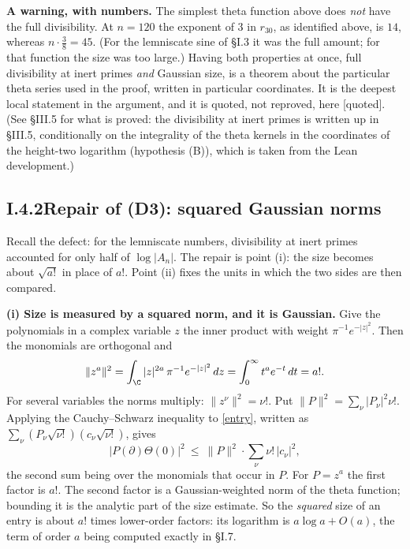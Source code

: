 \documentclass[11pt,letterpaper]{article}
\newcommand{\quoted}{\textsf{[quoted]}}
\begin{document}
\textbf{A warning, with numbers.} The simplest theta function above does \emph{not} have the full
divisibility. At $n=120$ the exponent of $3$ in $r_{30}$, as identified above, is $14$, whereas $n\cdot\frac{3}{8}=45$. (For the
lemniscate sine of \S I.3 it was the full amount; for that function the size was too large.) Having both
properties at once, full divisibility at inert primes \emph{and} Gaussian size, is a theorem about the
particular theta series used in the proof, written in particular coordinates. It is the deepest local
statement in the argument, and it is quoted, not reproved, here \quoted. (See \S III.5 for what is proved:
the divisibility at inert primes is written up in \S III.5, conditionally on the integrality of the theta kernels in the coordinates of the height-two logarithm (hypothesis (B)), which is taken from the Lean development.)

\subsection*{I.4.2\quad Repair of (D3): squared Gaussian norms}

Recall the defect: for the lemniscate numbers, divisibility at inert primes accounted for only half of
$\log|A_n|$. The repair is point (i): the size becomes about $\sqrt{a!}$ in place of $a!$. Point (ii) fixes
the units in which the two sides are then compared.

\textbf{(i) Size is measured by a squared norm, and it is Gaussian.} Give the polynomials in a complex
variable $z$ the inner product with weight $\pi^{-1}e^{-|z|^2}$. Then the monomials are orthogonal and
\begin{equation}\label{D:16}
 \|z^a\|^2=\int_{\C}|z|^{2a}\,\pi^{-1}e^{-|z|^2}\,dz=\int_0^\infty t^ae^{-t}\,dt=a! .
\end{equation}
For several variables the norms multiply: $\|z^\nu\|^2=\nu!$. Put
$\|P\|^2=\sum_\nu|P_\nu|^2\nu!$. Applying the Cauchy--Schwarz inequality to \eqref{entry}, written as
$\sum_\nu(P_\nu\sqrt{\nu!})(c_\nu\sqrt{\nu!})$, gives
\begin{equation}\label{CS}
 \big|P(\partial)\Theta(0)\big|^2\ \le\ \|P\|^2\cdot\sum_{\nu}\nu!\,|c_\nu|^2 ,
\end{equation}
the second sum being over the monomials that occur in $P$. For $P=z^a$ the first
factor is $a!$. The second factor is a Gaussian-weighted norm of the theta function; bounding it is the
analytic part of the size estimate. So the \emph{squared} size of an entry is about $a!$ times lower-order
factors: its logarithm is $a\log a+O(a)$, the term of order $a$ being computed exactly in \S I.7.
\end{document}
